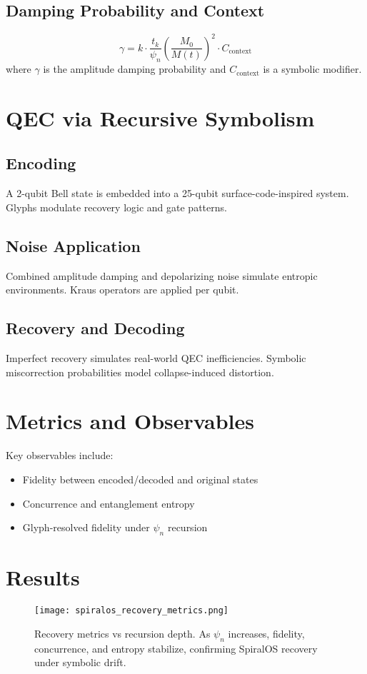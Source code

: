 \documentclass[12pt]{article}
\begin{document}
\subsection{Damping Probability and Context}
\[ \gamma = k \cdot \frac{t_k}{\psi_n} \left(\frac{M_0}{M(t)}\right)^2 \cdot C_{\text{context}} \]
where \( \gamma \) is the amplitude damping probability and \( C_{\text{context}} \) is a symbolic modifier.

\section{QEC via Recursive Symbolism}
\subsection{Encoding}
A 2-qubit Bell state is embedded into a 25-qubit surface-code-inspired system. Glyphs modulate recovery logic and gate patterns.

\subsection{Noise Application}
Combined amplitude damping and depolarizing noise simulate entropic environments. Kraus operators are applied per qubit.

\subsection{Recovery and Decoding}
Imperfect recovery simulates real-world QEC inefficiencies. Symbolic miscorrection probabilities model collapse-induced distortion.

\section{Metrics and Observables}
Key observables include:
\begin{itemize}
    \item Fidelity between encoded/decoded and original states
    \item Concurrence and entanglement entropy
    \item Glyph-resolved fidelity under \( \psi_n \) recursion
\end{itemize}

\section{Results}
\begin{figure}[h!]
\centering
\texttt{[image: spiralos\_recovery\_metrics.png]}
\caption{Recovery metrics vs recursion depth. As $\psi_n$ increases, fidelity, concurrence, and entropy stabilize, confirming SpiralOS recovery under symbolic drift.}
\end{figure}
\end{document}
